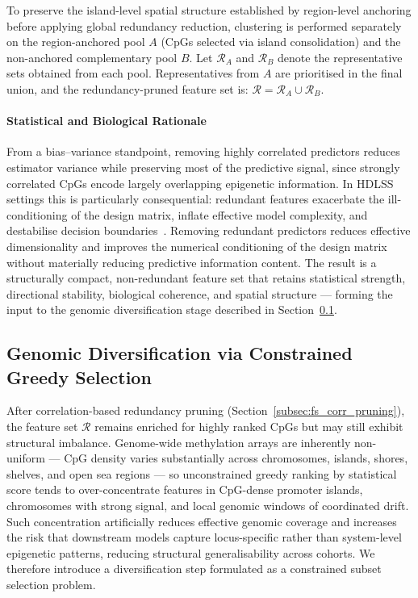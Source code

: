 To preserve the island-level spatial structure established 
by region-level anchoring before applying global redundancy 
reduction, clustering is performed separately on the 
region-anchored pool $A$ (CpGs selected via island 
consolidation) and the non-anchored complementary pool 
$B$. Let $\mathcal{R}_A$ and $\mathcal{R}_B$ denote the 
representative sets obtained from each pool. Representatives 
from $A$ are prioritised in the final union, and the 
redundancy-pruned feature set is:
\(
\mathcal{R}
=
\mathcal{R}_A
\cup
\mathcal{R}_B.
\)

\paragraph{Statistical and Biological Rationale}

From a bias--variance standpoint, removing highly 
correlated predictors reduces estimator variance while 
preserving most of the predictive signal, since strongly 
correlated CpGs encode largely overlapping epigenetic 
information. In HDLSS settings this is particularly 
consequential: redundant features exacerbate the 
ill-conditioning of the design matrix, inflate effective 
model complexity, and destabilise decision 
boundaries~\cite{Donoho2000}. Removing redundant predictors reduces effective dimensionality 
and improves the numerical conditioning of the design matrix 
without materially reducing predictive information content.
The result is a structurally compact, non-redundant 
feature set that retains statistical strength, directional 
stability, biological coherence, and spatial structure — 
forming the input to the genomic diversification stage 
described in Section~\ref{subsec:fs_diversification}.

\subsection{Genomic Diversification via Constrained Greedy Selection}
\label{subsec:fs_diversification}

After correlation-based redundancy pruning 
(Section~\ref{subsec:fs_corr_pruning}), the feature set 
$\mathcal{R}$ remains enriched for highly ranked CpGs but 
may still exhibit structural imbalance. Genome-wide 
methylation arrays are inherently non-uniform — CpG density 
varies substantially across chromosomes, islands, shores, 
shelves, and open sea regions — so unconstrained greedy 
ranking by statistical score tends to over-concentrate 
features in CpG-dense promoter islands, chromosomes with 
strong signal, and local genomic windows of coordinated 
drift. Such concentration artificially reduces effective 
genomic coverage and increases the risk that downstream 
models capture locus-specific rather than system-level 
epigenetic patterns, reducing structural generalisability 
across cohorts. We therefore introduce a diversification 
step formulated as a constrained subset selection problem.

